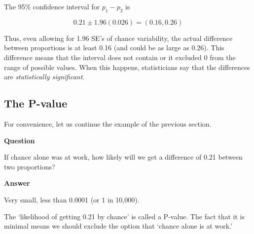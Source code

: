 \documentclass[11pt, chapterprefix=true]{scrbook}\usepackage[]{graphicx}\usepackage[]{color}
\begin{document}
\vspace{5mm}

The 95\% confidence interval for $p_1 - p_2$ is

\begin{equation*}
0.21 \pm 1.96 (0.026) = (0.16, 0.26)
\end{equation*}

Thus, even allowing for 1.96 SE's of chance variability, the actual difference between proportions is at least 0.16 (and could be as large as 0.26).  This difference means that the interval does not contain or it excluded 0 from the range of possible values.  When this happens, statisticians say that the differences are \textit{statistically significant}.


\subsection{The P-value}

For convenience, let us continue the example of the previous section.

\begin{minipage}[ht]{3cm}

\vspace{-4mm}

\textbf{Question}
\end{minipage}
\begin{minipage}[ht]{12cm}

\parbox{12cm}{
If chance alone was at work, how likely will we get a difference of 0.21 between two proportions?
}
\end{minipage}

\begin{minipage}[ht]{3cm}

\vspace{-3mm}

\textbf{Answer}
\end{minipage}
\begin{minipage}[ht]{12cm}

\parbox{12cm}{
Very small, less than 0.0001 (or 1 in 10,000).
}
\end{minipage}

The `likelihood of getting 0.21 by chance' is called a P-value. The fact that it is minimal means we should exclude the option that `chance alone is at work.'
\end{document}

